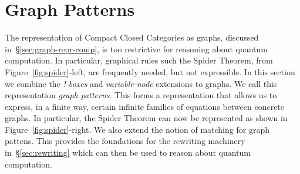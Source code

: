 \documentclass[runningheads]{llncs}
\begin{document}
\section{Graph Patterns}
\label{sec:patterns}

The representation of Compact Closed Categories as graphs, discussed
in~\S\ref{sec:graph-repr-comp}, is too restrictive for reasoning about
quantum computation. In particular, graphical rules such the Spider
Theorem, from Figure~\ref{fig:spider}-left, are frequently needed, but
not expressible. In this section we combine the {\em !-boxes} and {\em
  variable-node} extensions to graphs. We call this representation
\emph{graph patterns}. This forms a representation that allows us to
express, in a finite way, certain infinite families of equations
between concrete graphs. In particular, the Spider Theorem can now be
represented as shown in Figure~\ref{fig:spider}-right. We also extend
the notion of matching for graph pattens.
This provides the foundations for the rewriting machinery
in~\S\ref{sec:rewriting} which can then be used to reason about
quantum computation.




\end{document}
